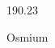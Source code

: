 \documentclass[12pt]{article}
\begin{document}
\hfill{}
\vfill
\begin{center}
  {\fontsize{50}{60}
  }

  190.23

Osmium
\end{center}
\vfill
\end{document}
